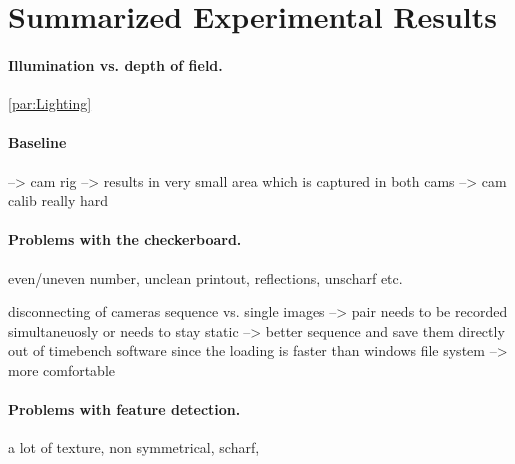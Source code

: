 \section{Summarized Experimental Results}

\paragraph{Illumination vs. depth of field.}
\autoref{par:Lighting}

\paragraph{Baseline}
--> cam rig
--> results in very small area which is captured in both cams --> cam calib really hard

\paragraph{Problems with the checkerboard.}
even/uneven number, unclean printout, reflections, unscharf etc.

disconnecting of cameras
sequence vs. single images --> pair needs to be recorded simultaneuosly or needs to stay static --> better sequence and save them directly out of timebench software since the loading is faster than windows file system --> more comfortable

\paragraph{Problems with feature detection.}
a lot of texture, non symmetrical, scharf,